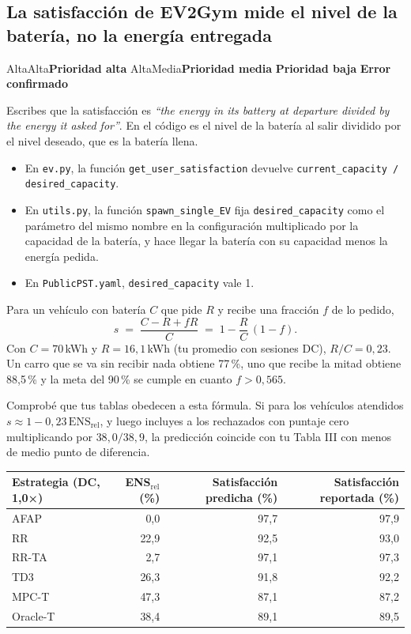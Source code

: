 \documentclass[11pt]{article}
\newcommand{\prioridad}[1]{%
  \def\tmpA{Alta}\def\tmpM{Media}\def\tmp{#1}%
  \ifx\tmp\tmpA\colorbox{rojoerror}{\color{white}\small\bfseries Prioridad alta}%
  \else\ifx\tmp\tmpM\colorbox{naranjatarea}{\color{white}\small\bfseries Prioridad media}%
  \else\colorbox{azulidea}{\color{white}\small\bfseries Prioridad baja}\fi\fi}
\newcommand{\confirmado}{\colorbox{rojoerror!15}{\small\bfseries\color{rojoerror} Error confirmado}}
\begin{document}
\subsection{La satisfacción de EV2Gym mide el nivel de la batería, no la energía entregada}
\prioridad{Alta} \confirmado

\begin{error}
Escribes que la satisfacción es \foreignlanguage{english}{\emph{``the energy in its battery at departure divided by the energy it asked for''}}. En el código es el nivel de la batería al salir dividido por el nivel deseado, que es la batería llena.
\begin{itemize}[leftmargin=1.2em]
\item En \texttt{ev.py}, la función \texttt{get\_user\_satisfaction} devuelve \texttt{current\_capacity / desired\_capacity}.
\item En \texttt{utils.py}, la función \texttt{spawn\_single\_EV} fija \texttt{desired\_capacity} como el parámetro del mismo nombre en la configuración multiplicado por la capacidad de la batería, y hace llegar la batería con su capacidad menos la energía pedida.
\item En \texttt{PublicPST.yaml}, \texttt{desired\_capacity} vale 1.
\end{itemize}
Para un vehículo con batería $C$ que pide $R$ y recibe una fracción $f$ de lo pedido,
\[
s \;=\; \frac{C - R + fR}{C} \;=\; 1 - \frac{R}{C}\,(1-f).
\]
Con $C = 70$\,kWh y $R = 16{,}1$\,kWh (tu promedio con sesiones DC), $R/C = 0{,}23$. Un carro que se va sin recibir nada obtiene 77\,\%, uno que recibe la mitad obtiene 88,5\,\% y la meta del 90\,\% se cumple en cuanto $f > 0{,}565$.
\end{error}

Comprobé que tus tablas obedecen a esta fórmula. Si para los vehículos atendidos $s \approx 1 - 0{,}23\,\mathrm{ENS}_{\mathrm{rel}}$, y luego incluyes a los rechazados con puntaje cero multiplicando por $38{,}0/38{,}9$, la predicción coincide con tu Tabla III con menos de medio punto de diferencia.

\begin{center}
\small
\begin{tabular}{@{}lrrr@{}}
\toprule
Estrategia (DC, 1,0×) & ENS$_{\mathrm{rel}}$ (\%) & Satisfacción predicha (\%) & Satisfacción reportada (\%) \\
\midrule
AFAP & 0,0 & 97,7 & 97,9 \\
RR & 22,9 & 92,5 & 93,0 \\
RR-TA & 2,7 & 97,1 & 97,3 \\
TD3 & 26,3 & 91,8 & 92,2 \\
MPC-T & 47,3 & 87,1 & 87,2 \\
Oracle-T & 38,4 & 89,1 & 89,5 \\
\bottomrule
\end{tabular}
\end{center}
\end{document}
